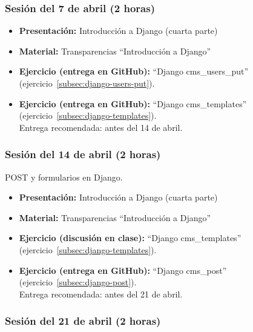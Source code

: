 \documentclass[a4paper,12pt]{article}
\begin{document}
\subsubsection{Sesión del 7 de abril (2 horas)}

\begin{itemize}
 \item \textbf{Presentación:} Introducción a Django (cuarta parte)
 \item \textbf{Material:} Transparencias ``Introducción a Django''
 \item \textbf{Ejercicio (entrega en GitHub):} ``Django cms\_users\_put'' (ejercicio~\ref{subsec:django-users-put}).
 \item \textbf{Ejercicio (entrega en GitHub):} ``Django cms\_templates'' (ejercicio~\ref{subsec:django-templates}). \\
  Entrega recomendada: antes del 14 de abril.
\end{itemize}


\subsubsection{Sesión del 14 de abril (2 horas)}

POST y formularios en Django.

\begin{itemize}
    \item \textbf{Presentación:} Introducción a Django (cuarta parte)
    \item \textbf{Material:} Transparencias ``Introducción a Django''
     \item \textbf{Ejercicio (discusión en clase):} ``Django cms\_templates'' (ejercicio~\ref{subsec:django-templates}). \\
    \item \textbf{Ejercicio (entrega en GitHub):} ``Django cms\_post'' (ejercicio~\ref{subsec:django-post}).\\
  Entrega recomendada: antes del 21 de abril.
\end{itemize}

\subsubsection{Sesión del 21 de abril (2 horas)}
\end{document}
